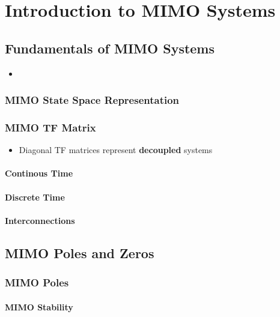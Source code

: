 \section{Introduction to MIMO Systems}
\subsection{Fundamentals of MIMO Systems}

\begin{itemize}
    \item 
\end{itemize}

\subsubsection{MIMO State Space Representation}


\subsubsection{MIMO TF Matrix}

\begin{itemize}
    \item Diagonal TF matrices represent \textbf{decoupled} systems
\end{itemize}

\paragraph{Continous Time}
\paragraph{Discrete Time}
\paragraph{Interconnections}

\subsection{MIMO Poles and Zeros}
\subsubsection{MIMO Poles}
\paragraph{MIMO Stability}

